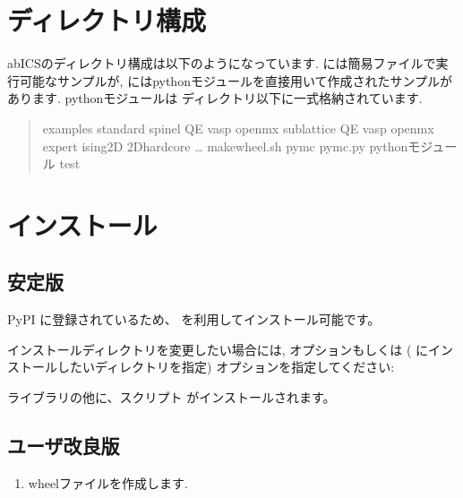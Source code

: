 \documentclass[letterpaper,10pt,dvipdfmx]{sphinxmanual}
\begin{document}
\section{ディレクトリ構成}
\label{\detokenize{install/install:id3}}
abICSのディレクトリ構成は以下のようになっています.
 には簡易ファイルで実行可能なサンプルが,
 にはpythonモジュールを直接用いて作成されたサンプルがあります.
pythonモジュールは  ディレクトリ以下に一式格納されています.
\begin{quote}

\begin{sphinxVerbatim}[commandchars=\\\{\}]
 \PYGZhy{} examples
    \PYGZhy{} standard
        \PYGZhy{} spinel
            \PYGZhy{} QE
            \PYGZhy{} vasp
            \PYGZhy{} openmx
        \PYGZhy{} sub\PYGZhy{}lattice
            \PYGZhy{} QE
            \PYGZhy{} vasp
            \PYGZhy{} openmx
    \PYGZhy{} expert
        \PYGZhy{} ising2D
        \PYGZhy{} 2D\PYGZus{}hardcore
        …
\PYGZhy{} make\PYGZus{}wheel.sh
\PYGZhy{} py\PYGZus{}mc
    \PYGZhy{} pymc.py
    \PYGZhy{} pythonモジュール
\PYGZhy{} test
\end{sphinxVerbatim}
\end{quote}


\section{インストール}
\label{\detokenize{install/install:id4}}

\subsection{安定版}
\label{\detokenize{install/install:id5}}
PyPI に登録されているため、  を利用してインストール可能です。


インストールディレクトリを変更したい場合には,  オプションもしくは  (  にインストールしたいディレクトリを指定) オプションを指定してください:


ライブラリの他に、スクリプト  がインストールされます。


\subsection{ユーザ改良版}
\label{\detokenize{install/install:id6}}\begin{enumerate}
\item {} 
wheelファイルを作成します.

\end{enumerate}
\end{document}
